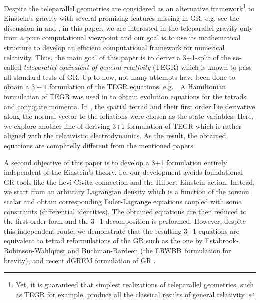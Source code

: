 \documentclass[
10pt, %
a4paper, %
oneside, %
twocolumn,
headinclude,footinclude, %
BCOR5mm, %
]{scrartcl}
\newcommand{\ERWBB}{{ERWBB}}
\begin{document}
	Despite the teleparallel geometries are considered as an alternative
	framework\footnote{Yet, it is guaranteed that simplest realizations of teleparallel geometries, such as TEGR for example, produce all the
	classical results of general relativity
	\cite{AldrovandiPereiraBook,Bahamonde2021a}.} to Einstein's gravity with
	several promising features missing in GR, e.g. see the discussion in
	\cite[Sec.18]{AldrovandiPereiraBook} and \cite{Cai2016}, in this paper, we
	are interested in the teleparallel gravity only from a pure computational
	viewpoint and our goal is to use its mathematical structure to develop an
	efficient computational framework for numerical relativity. Thus, the main
	goal of this paper is to derive a 3+1-split of the so-called
	\emph{teleparallel equivalent of general relativity} (TEGR)
	\cite{AldrovandiPereiraBook,Krssak2019} which is known to pass all standard
	tests of GR. Up to now, not many attempts have been done to obtain a $ 3+1
	$ formulation of the TEGR equations, e.g. \cite{Capozziello2021,Pati2022}. A
	Hamiltonian formulation of TEGR was used in \cite{Pati2022} to obtain
	evolution equations for the tetrads and conjugate momenta. In
	\cite{Capozziello2021}, the spatial tetrad and their first order Lie
	derivative along the normal vector to the foliations were chosen as the
	state variables. Here, we explore another line of deriving 3+1
	formulation of TEGR which is rather aligned with the relativistic
	electrodynamics. As the result, the obtained equations are complitelly
	different from the mentioned papers.

	A second objective of this paper is to develop a 3+1 formulation entirely
	independent of the Einstein's theory, i.e. our development avoids
	foundational GR tools like the Levi-Civita connection and the
	Hilbert-Einstein action. Instead, we start from an arbitrary Lagrangian
	density which is a function of the torsion scalar and obtain corresponding
	Euler-Lagrange equations coupled with some constraints (differential
	identities). The obtained equations are then reduced to the first-order form
	and the 3+1 decomposition is performed. However, despite this independent
	route, we demonstrate that the resulting 3+1 equations are equivalent to
	tetrad reformulations of the GR such as the one by
	Estabrook-Robinson-Wahlquist \cite{Estabrook1997} and Buchman-Bardeen
	\cite{Buchman2003} (the \ERWBB\ formulation for brevity), and recent dGREM formulation of GR \cite{Olivares2022}. 
	
\end{document}

